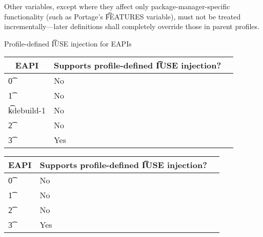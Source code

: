 Other variables, except where they affect only package-manager-specific functionality (such as
Portage's \t{FEATURES} variable), must not be treated incrementally---later definitions shall
completely override those in parent profiles.

\begin{centertable}{Profile-defined \t{IUSE} injection for EAPIs} \label{tab:profile-iuse-injection-table}
\IFKDEBUILDELSE
{
    \begin{tabular}{ l l l }
        \toprule
        \multicolumn{1}{c}{\textbf{EAPI}} &
        \multicolumn{1}{c}{\textbf{Supports profile-defined \t{IUSE} injection?}} \\
        \midrule
    \t{0} & No \\
    \t{1} & No \\
    \t{kdebuild-1} & No \\
    \t{2} & No \\
    \t{3} & Yes \\
    \bottomrule
    \end{tabular}
}{
    \begin{tabular}{ l l l }
        \toprule
        \multicolumn{1}{c}{\textbf{EAPI}} &
        \multicolumn{1}{c}{\textbf{Supports profile-defined \t{IUSE} injection?}} \\
        \midrule
    \t{0} & No \\
    \t{1} & No \\
    \t{2} & No \\
    \t{3} & Yes \\
    \bottomrule
    \end{tabular}
}
\end{centertable}

